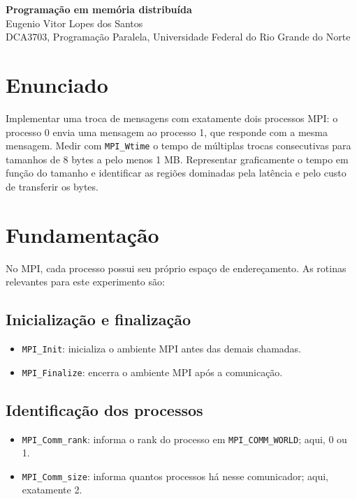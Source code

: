 \documentclass[11pt,letterpaper]{article}
\begin{document}
\pagestyle{plain}
\begin{center}
{\LARGE\bfseries Programação em memória distribuída}\\[0.4em]
{\normalsize Eugenio Vitor Lopes dos Santos}\\[0.3em]
{\small DCA3703, Programação Paralela, Universidade Federal do Rio Grande do Norte}
\end{center}

\section{Enunciado}
Implementar uma troca de mensagens com exatamente dois processos MPI: o processo 0 envia uma mensagem ao processo 1, que responde com a mesma mensagem. Medir com \texttt{MPI\_Wtime} o tempo de múltiplas trocas consecutivas para tamanhos de 8 bytes a pelo menos 1 MB. Representar graficamente o tempo em função do tamanho e identificar as regiões dominadas pela latência e pelo custo de transferir os bytes.

\section{Fundamentação}
No MPI, cada processo possui seu próprio espaço de endereçamento. As rotinas relevantes para este experimento são:

\subsection{Inicialização e finalização}
\begin{itemize}
\item \texttt{MPI\_Init}: inicializa o ambiente MPI antes das demais chamadas.
\item \texttt{MPI\_Finalize}: encerra o ambiente MPI após a comunicação.
\end{itemize}

\subsection{Identificação dos processos}
\begin{itemize}
\item \texttt{MPI\_Comm\_rank}: informa o rank do processo em \texttt{MPI\_COMM\_WORLD}; aqui, 0 ou 1.
\item \texttt{MPI\_Comm\_size}: informa quantos processos há nesse comunicador; aqui, exatamente 2.
\end{itemize}
\end{document}
